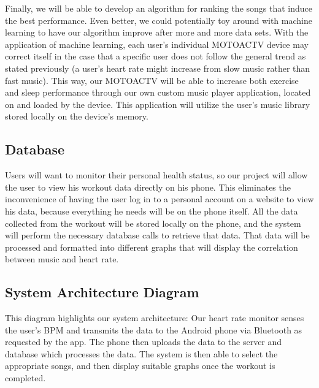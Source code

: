\documentclass[letterpaper,english, 12pt]{scrreprt}
\begin{document}
Finally, we will be able to develop an algorithm for ranking the songs that induce the best performance. Even better, we could potentially toy around with machine learning to have our algorithm improve after more and more data sets. With the application of machine learning, each user's individual MOTOACTV device may correct itself in the case that a specific user does not follow the general trend as stated previously (a user's heart rate might increase from slow music rather than fast music). This way, our MOTOACTV will be able to increase both exercise and sleep performance through our own custom music player application, located on and loaded by the device. This application will utilize the user's music library stored locally on the device's memory.\\

\subsection{Database}
Users will want to monitor their personal health status, so our project will allow the user to view his workout data directly on his phone. This eliminates the inconvenience of having the user log in to a personal account on a website to view his data, because everything he needs will be on the phone itself. All the data collected from the workout will be stored locally on the phone, and the system will perform the necessary database calls to retrieve that data. That data will be processed and formatted into different graphs that will display the correlation between music and heart rate.\\


\subsection{System Architecture Diagram}
This diagram highlights our system architecture: Our heart rate monitor senses the
user's BPM and transmits the data to the Android phone via Bluetooth as requested
by the app. The phone then uploads the data to the server and database
which processes the data. The system is then able to select the appropriate
songs, and then display suitable graphs once the workout is completed.\\
\end{document}
